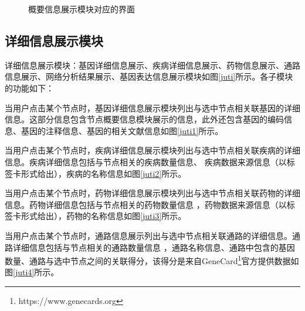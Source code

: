 \begin{figure}[!htbp]
\begin{minipage}{.95\linewidth}
\begin{minipage}{\textwidth}
      \subfigure{\label{gaiyao4}}\addtocounter{subfigure}{-2}
    \end{minipage}
  \caption[gaiyao]{概要信息展示模块对应的界面}
  \label{gaiyao}
  \end{minipage}
\end{figure}

\subsection{详细信息展示模块}
详细信息展示模块：基因详细信息展示、疾病详细信息展示、药物信息展示、通路信息展示、网络分析结果展示、基因表达信息展示模块如图\ref{juti}所示。各子模块的功能如下：

当用户点击某个节点时，基因详细信息展示模块列出与选中节点相关联基因的详细信息。这部分信息包含节点概要信息模块展示的信息，此外还包含基因的编码信息、基因的注释信息、基因的相关文献信息如图\ref{juti1}所示。

当用户点击某个节点时，疾病详细信息展示模块列出与选中节点相关联疾病的详细信息。疾病详细信息包括与节点相关的疾病数量信息、
疾病数据来源信息（以标签卡形式给出），疾病的名称信息如图\ref{juti2}所示。

当用户点击某个节点时，药物详细信息展示模块列出与选中节点相关联药物的详细信息。药物详细信息包括与节点相关的药物数量信息
，药物数据来源信息（以标签卡形式给出），药物的名称信息如图\ref{juti3}所示。

当用户点击某个节点时，通路信息展示列出与选中节点相关联通路的详细信息。通路详细信息包括与节点相关的通路数量信息
，通路名称信息、通路中包含的基因数量、通路与选中节点之间的关联得分，该得分是来自GeneCard\footnote{https://www.genecards.org}官方提供数据如图\ref{juti4}所示。

